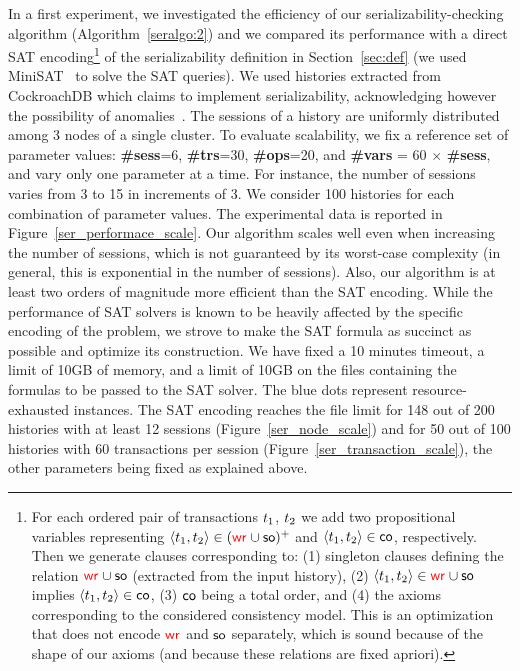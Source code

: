 In a first experiment, we investigated the efficiency of our serializability-checking algorithm (Algorithm~\ref{seralgo:2}) and we compared its performance with a direct SAT encoding\footnote{For each ordered pair of transactions ${t}_1$, ${t}_2$ we add two propositional variables representing ${\left\langle{{t}_1,{t}_2}\right\rangle} \in (\textcolor{red}{\mathsf{wr}_{}} \cup \mathsf{so})^+$ and ${\left\langle{{t}_1,{t}_2}\right\rangle} \in \textsf{co}$, respectively. Then we generate clauses corresponding to: (1) singleton clauses defining the relation $\textcolor{red}{\mathsf{wr}_{}} \cup \mathsf{so}$ (extracted from the input history), (2) ${\left\langle{{t}_1, {t}_2}\right\rangle} \in \textcolor{red}{\mathsf{wr}_{}} \cup \mathsf{so}$ implies ${\left\langle{{t}_1, {t}_2}\right\rangle} \in \textsf{co}$, (3) $\textsf{co}$ being a total order, and (4) the axioms corresponding to the considered consistency model. This is an optimization that does not encode $\textcolor{red}{\mathsf{wr}_{}}$ and $\mathsf{so}$ separately, which is sound because of the shape of our axioms (and because these relations are fixed apriori).} of the serializability definition in Section~\ref{sec:def} (we used MiniSAT~\cite{DBLP:conf/sat/EenS03} to solve the SAT queries). We used histories extracted from CockroachDB which claims to implement serializability, acknowledging however the possibility of anomalies~\cite{cockroach-claim}. The sessions of a history are uniformly distributed among 3 nodes of a single cluster. To evaluate scalability, we fix a reference set of parameter values: {\bf \#sess}=6, {\bf \#trs}=30, {\bf \#ops}=20, and {\bf \#vars} = 60 $\times$ {\bf \#sess}, and vary only one parameter at a time. For instance, the number of sessions varies from 3 to 15 in increments of 3. 
We consider 100 histories for each combination of parameter values. The experimental data is reported in Figure~\ref{ser_performace_scale}. Our algorithm scales well even when increasing the number of sessions, which is not guaranteed by its worst-case complexity (in general, this is exponential in the number of sessions). Also, our algorithm is at least two orders of magnitude more efficient than the SAT encoding. While the performance of SAT solvers is known to be heavily affected by the specific encoding of the problem, we strove to make the SAT formula as succinct as possible and optimize its construction.
We have fixed a 10 minutes timeout, a limit of 10GB of memory, and a limit of 10GB on the files containing the formulas to be passed to the SAT solver. The blue dots represent resource-exhausted instances. The SAT encoding reaches the file limit for 148 out of 200 histories with at least 12 sessions (Figure~\ref{ser_node_scale}) and for 50 out of 100 histories with 60 transactions per session (Figure~\ref{ser_transaction_scale}), the other parameters being fixed as explained above. 

